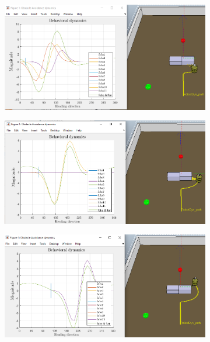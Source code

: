 \begin{figure}[htb!]
\begin{subfigure}{.45\textwidth}
  \end{subfigure}
  \begin{subfigure}{.45\textwidth}
    \includegraphics[width=\textwidth]{img/3-2-3.PNG}%
  \caption{}%
  \label{fig:obs-tar-nonlinear-behavioral-3}
  \end{subfigure}
  \begin{subfigure}{.45\textwidth}
    \includegraphics[width=\textwidth]{img/3-2-4.PNG}%
  \caption{}%
  \label{fig:obs-tar-nonlinear-behavioral-4}
  \end{subfigure}
  \begin{subfigure}{.45\textwidth}
    \includegraphics[width=\textwidth]{img/3-2-5.PNG}%

\end{subfigure}
\end{figure}
